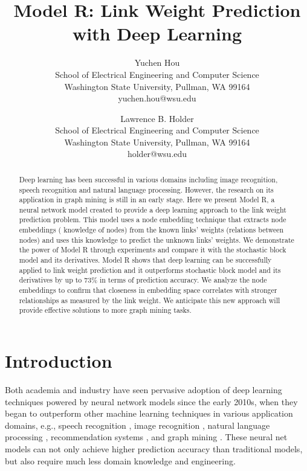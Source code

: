 \documentclass[11pt,twocolumn]{article}
\begin{document}
\title{Model R: Link Weight Prediction with Deep Learning}
\author{
	Yuchen Hou\\
	School of Electrical Engineering and Computer Science \\
	Washington State University, Pullman, WA 99164 \\
	yuchen.hou@wsu.edu
	\and
	Lawrence B. Holder\\
	School of Electrical Engineering and Computer Science \\
	Washington State University, Pullman, WA 99164 \\
	holder@wsu.edu
}
\maketitle

\begin{abstract}
Deep learning has been successful in various domains 
including image recognition, speech recognition and natural language 
processing.
However, the research on its application in graph mining is 
still in an early stage.
Here we present Model R, a neural network model created to provide a deep 
learning approach to the link weight prediction problem.
This model uses a node embedding technique that extracts node embeddings (
knowledge of nodes) from the known links' weights (relations between nodes) and 
uses this knowledge to predict the unknown links' weights.
We demonstrate the power of Model R through experiments and compare it with 
the stochastic block model and its derivatives.
Model R shows that deep learning can be successfully applied to 
link weight prediction and it outperforms stochastic block model and its derivatives by up to 73\% in terms of prediction accuracy.
We analyze the node embeddings to confirm that closeness in embedding space correlates with stronger relationships as measured by the link weight.
We anticipate this new approach will provide effective solutions to more
graph mining tasks.
\end{abstract}

\section{Introduction}
Both academia and industry have seen pervasive adoption of deep learning 
techniques powered by neural network models since the early 2010s,
when they began to outperform other machine learning techniques in various 
application domains, e.g.,
speech recognition \cite{hannun2014deep},
image recognition \cite{simonyan2014very},
natural language processing \cite{yao2013recurrent},
recommendation systems \cite{barkan2016item2vec},
and graph mining \cite{grover2016node2vec}.
These neural net models can not only achieve higher prediction accuracy than 
traditional models,
but also require much less domain knowledge and engineering.
\end{document}
